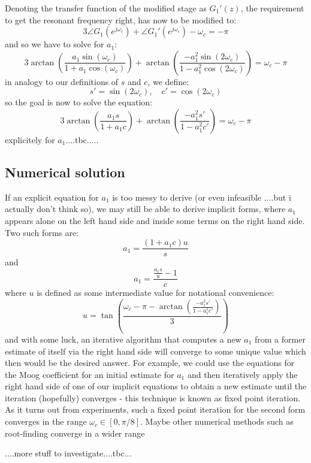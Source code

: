 Denoting the transfer function of the modified stage as $G_1'(z)$, the requirement to get the resonant frequency right, has now to be modified to:
\begin{equation}
3 \angle G_1(e^{j \omega_c}) + \angle G_1'(e^{j \omega_c}) - \omega_c = -\pi
\end{equation}
and so we have to solve for $a_1$:
\begin{equation}
  3 \arctan \left(\frac{ a_1   \sin ( \omega_c)} {1 + a_1   \cos ( \omega_c)} \right) 
+   \arctan \left(\frac{-a_1^2 \sin (2\omega_c)} {1 - a_1^2 \cos (2\omega_c)} \right) 
= \omega_c - \pi
\end{equation}
in analogy to our definitions of $s$ and $c$, we define:
\begin{equation}
\label{eqn:sc_dash}
\boxed
{
 s' = \sin(2\omega_c), \quad c' = \cos(2\omega_c)
}
\end{equation}
so the goal is now to solve the equation: 
\begin{equation}
  3 \arctan \left(\frac{ a_1   s } {1 + a_1   c } \right) 
+   \arctan \left(\frac{-a_1^2 s'} {1 - a_1^2 c'} \right) 
= \omega_c - \pi
\end{equation}
explicitely for $a_1$....tbc.....

\subsection{Numerical solution}
If an explicit equation for $a_1$ is too messy to derive (or even infeasible ....but i actually don't think so), we may still be able to derive implicit forms, where $a_1$ appears alone on the left hand side and inside some terms on the right hand side. Two such forms are:
\begin{equation}
 a_1 = \frac{(1+a_1 c) u}{s}
\end{equation}
and
\begin{equation}
 a_1 = \frac{ \frac{a_1 s}{u}-1}{c}
\end{equation}
where $u$ is defined as some intermediate value for notational convenience:
\begin{equation}
  u = \tan \left( \frac{\omega_c-\pi-\arctan \left( \frac{-a_1^2 s'}{1-a_1^2c'}  \right) }{3}  \right) 
\end{equation}
and with some luck, an iterative algorithm that computes a new $a_1$ from a former estimate of itself via the right hand side will converge to some unique value which then would be the desired answer. For example, we could use the equations for the Moog coefficient for an initial estimate for $a_1$ and then iteratively apply the right hand side of one of our implicit equations to obtain a new estimate until the iteration (hopefully) converges - this technique is known as fixed point iteration. As it turns out from experiments, such a fixed point iteration for the second form converges in the range $\omega_c \in [0, \pi/8]$. Maybe other numerical methods such as root-finding converge in a wider range 

....more stuff to investigate....tbc...



















